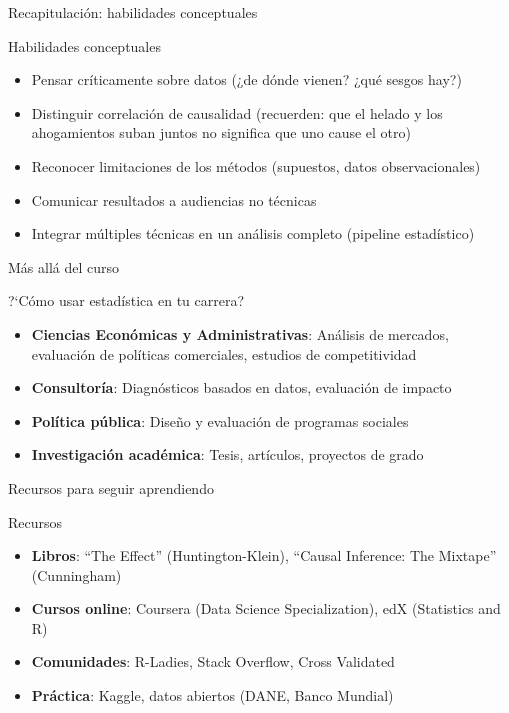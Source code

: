 \documentclass[aspectratio=169, 11pt]{beamer}
\begin{document}
\begin{frame}{Recapitulación: habilidades conceptuales}
\begin{block}{Habilidades conceptuales}
\begin{itemize}
\item Pensar críticamente sobre datos (¿de dónde vienen? ¿qué sesgos hay?)
\item Distinguir correlaci\'on de causalidad (recuerden: que el helado y los ahogamientos suban juntos no significa que uno cause el otro)
\item Reconocer limitaciones de los métodos (supuestos, datos observacionales)
\item Comunicar resultados a audiencias no técnicas
\item Integrar múltiples técnicas en un análisis completo (pipeline estadístico)
\end{itemize}
\end{block}
\end{frame}

\begin{frame}{M\'as all\'a del curso}
\begin{block}{?`C\'omo usar estad\'istica en tu carrera?}
\small
\begin{itemize}
\item \textbf{Ciencias Econ\'omicas y Administrativas}: An\'alisis de mercados, evaluaci\'on de pol\'iticas comerciales, estudios de competitividad
\item \textbf{Consultor\'ia}: Diagn\'osticos basados en datos, evaluaci\'on de impacto
\item \textbf{Pol\'itica p\'ublica}: Dise\~no y evaluaci\'on de programas sociales
\item \textbf{Investigaci\'on acad\'emica}: Tesis, art\'iculos, proyectos de grado
\end{itemize}
\end{block}
\end{frame}

\begin{frame}{Recursos para seguir aprendiendo}
\begin{block}{Recursos}
\begin{itemize}
\item \textbf{Libros}: ``The Effect'' (Huntington-Klein), ``Causal Inference: The Mixtape'' (Cunningham)
\item \textbf{Cursos online}: Coursera (Data Science Specialization), edX (Statistics and R)
\item \textbf{Comunidades}: R-Ladies, Stack Overflow, Cross Validated
\item \textbf{Pr\'actica}: Kaggle, datos abiertos (DANE, Banco Mundial)
\end{itemize}
\end{block}
\end{frame}
\end{document}
